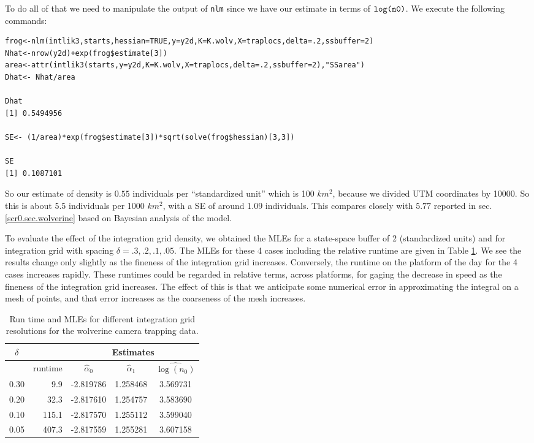 To do all of that we need to manipulate the output of
\mbox{\tt nlm} since we have our  estimate in terms of $\mbox{\tt
  log(n0)}$. We execute the following commands:
{\small 
\begin{verbatim}
frog<-nlm(intlik3,starts,hessian=TRUE,y=y2d,K=K.wolv,X=traplocs,delta=.2,ssbuffer=2)
Nhat<-nrow(y2d)+exp(frog$estimate[3])
area<-attr(intlik3(starts,y=y2d,K=K.wolv,X=traplocs,delta=.2,ssbuffer=2),"SSarea")
Dhat<- Nhat/area

Dhat
[1] 0.5494956

SE<- (1/area)*exp(frog$estimate[3])*sqrt(solve(frog$hessian)[3,3])

SE
[1] 0.1087101
\end{verbatim}
} 
So our estimate of density is $0.55$ individuals per ``standardized
unit'' which is 100 $km^2$, because we divided UTM coordinates by
10000.  So this is about 5.5 individuals per 1000 $km^2$,
with a SE of around 1.09
individuals.  This compares closely with $5.77$
reported in
sec. \ref{scr0.sec.wolverine} based on Bayesian
analysis of the model.


To evaluate the effect of the integration grid density, 
we obtained the MLEs for a state-space buffer of 2 (standardized
units) and for integration grid with spacing $\delta = .3, .2, .1,
.05$. The MLEs for these 4 cases including the relative runtime are
given in Table \ref{mle.tab.integration}.
We see the results change only slightly as the fineness of the
integration grid increases. Conversely, the runtime on the platform of
the day for the 4 cases increases rapidly. 
These runtimes could be regarded in
relative terms,  across platforms, for gaging the decrease in
speed as the fineness of the integration grid increases. The effect of
this is that we anticipate some numerical error in approximating the
integral on a mesh of points, and that error increases as the
coarseness of the mesh increases. 


\begin{table}[ht]
\centering
\caption{Run time and MLEs for different integration grid resolutions
  for the wolverine camera trapping data.}
\begin{tabular}{crccc}
\hline \hline
$\delta$ &   & \multicolumn{3}{c}{Estimates} \\ \hline
         &  runtime        & $\hat{\alpha}_0$ & $\hat{\alpha}_1$ &  $\widehat{\log(n_0)}$ \\ \hline
 0.30   &  9.9  &  -2.819786 & 1.258468 & 3.569731  \\
 0.20   & 32.3  &  -2.817610 & 1.254757 & 3.583690 \\
 0.10  & 115.1  &  -2.817570 & 1.255112 & 3.599040 \\
 0.05 &  407.3 &   -2.817559&  1.255281&  3.607158 \\ \hline
\end{tabular}
\label{mle.tab.integration}
\end{table}


